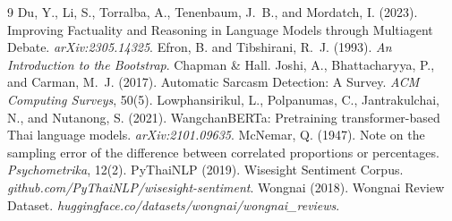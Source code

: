 \documentclass[10pt]{article}
\begin{document}
\begin{thebibliography}{9}\small
{} Du, Y., Li, S., Torralba, A., Tenenbaum, J.~B., and Mordatch, I. (2023).
Improving Factuality and Reasoning in Language Models through Multiagent Debate.
\emph{arXiv:2305.14325}.
 Efron, B. and Tibshirani, R.~J. (1993). \emph{An Introduction to the
Bootstrap}. Chapman \& Hall.
 Joshi, A., Bhattacharyya, P., and Carman, M.~J. (2017). Automatic Sarcasm
Detection: A Survey. \emph{ACM Computing Surveys}, 50(5).
 Lowphansirikul, L., Polpanumas, C., Jantrakulchai, N., and Nutanong,
S. (2021). WangchanBERTa: Pretraining transformer-based Thai language models.
\emph{arXiv:2101.09635}.
 McNemar, Q. (1947). Note on the sampling error of the difference between
correlated proportions or percentages. \emph{Psychometrika}, 12(2).
 PyThaiNLP (2019). Wisesight Sentiment Corpus.
\emph{github.com/PyThaiNLP/wisesight-sentiment}.
 Wongnai (2018). Wongnai Review Dataset.
\emph{huggingface.co/datasets/wongnai/wongnai\_reviews}.
\end{thebibliography}
\end{document}
